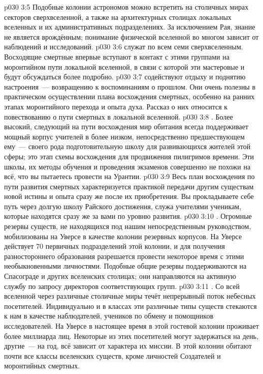 \vs p030 3:5 Подобные колонии астрономов можно встретить на столичных мирах секторов сверхвселенной, а также на архитектурных столицах локальных вселенных и их административных подразделениях. За исключением Рая, знание не является врождённым; понимание физической вселенной во многом зависит от наблюдений и исследований.
\vs p030 3:6  служат по всем семи сверхвселенным. Восходящие смертные впервые вступают в контакт с этими группами на моронтийном пути локальной вселенной, в связи с которой эти мастеровые и будут обсуждаться более подробно.
\vs p030 3:7  содействуют отдыху и поднятию настроения~--- возвращению к воспоминаниям о прошлом. Они очень полезны в практическом осуществлении плана восхождения смертных, особенно на ранних этапах моронтийного перехода и опыта духа. Рассказ о них относится к повествованию о пути смертных в локальной вселенной.
\vs p030 3:8 . Более высокий, следующий на пути восхождения мир обитания всегда поддерживает мощный корпус учителей в более низком, непосредственно предшествующем ему~--- своего рода подготовительную школу для развивающихся жителей этой сферы; это этап схемы восхождения для продвижения пилигримов времени. Эти школы, их методы обучения и проведения экзаменов совершенно не похожи на всё, что вы пытаетесь провести на Урантии.
\vs p030 3:9 Весь план восхождения по пути развития смертных характеризуется практикой передачи другим существам новой истины и опыта сразу же после их приобретения. Вы прокладываете себе путь через долгую школу Райского достижения, служа учителями ученикам, которые находятся сразу же за вами по уровню развития.
\vs p030 3:10 . Огромные резервы существ, не находящихся под нашим непосредственным руководством, мобилизованы на Уверсе в качестве колонии резервных корпусов. На Уверсе действует 70 первичных подразделений этой колонии, и для получения разностороннего образования разрешается провести некоторое время с этими необыкновенными личностями. Подобные общие резервы поддерживаются на Спасограде и других вселенских столицах; они направляются на активную службу по запросу директоров соответствующих групп.
\vs p030 3:11 . Со всей вселенной через различные столичные миры течёт непрерывный поток небесных посетителей. Индивидуально и в классах эти различные типы существ стекаются к нам в качестве наблюдателей, учеников по обмену и помощников исследователей. На Уверсе в настоящее время в этой гостевой колонии проживает более миллиарда лиц. Некоторые из этих посетителей могут задержаться на день, другие~--- на год, всё зависит от характера их миссии. В этой колонии обитают почти все классы вселенских существ, кроме личностей Создателей и моронтийных смертных.
